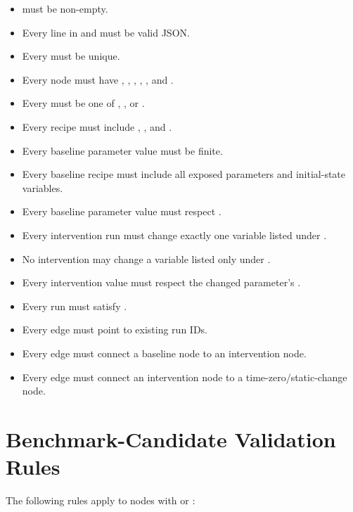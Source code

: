\documentclass[11pt]{article}
\begin{document}
\begin{itemize}
\item {} must be non-empty.
\item Every line in  and  must be valid JSON.
\item Every  must be unique.
\item Every node must have , , , , , and .
\item Every  must be one of , , or .
\item Every recipe must include , , and .
\item Every baseline parameter value must be finite.
\item Every baseline recipe must include all exposed parameters and initial-state variables.
\item Every baseline parameter value must respect .
\item Every intervention run must change exactly one variable listed under .
\item No intervention may change a variable listed only under .
\item Every intervention value must respect the changed parameter's .
\item Every  run must satisfy .
\item Every edge must point to existing run IDs.
\item Every  edge must connect a baseline node to an intervention node.
\item Every  edge must connect an intervention node to a time-zero/static-change node.
\end{itemize}

\section*{Benchmark-Candidate Validation Rules}

The following rules apply to nodes with  or :
\end{document}
